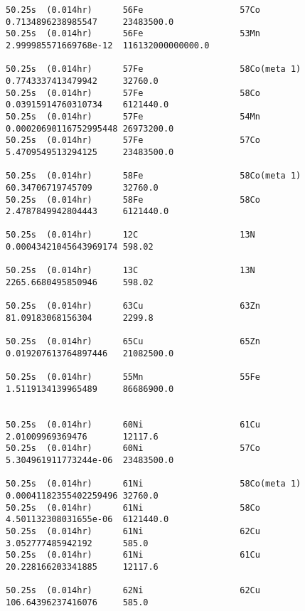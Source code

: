 \begin{lstlisting}[style=sOutputFile,caption={Final results for steel irradiation},label={listing:alexsteel}]
50.25s  (0.014hr)      56Fe                   57Co                   0.7134896238985547     23483500.0            
50.25s  (0.014hr)      56Fe                   53Mn                   2.999985571669768e-12  116132000000000.0     

50.25s  (0.014hr)      57Fe                   58Co(meta 1)           0.7743337413479942     32760.0               
50.25s  (0.014hr)      57Fe                   58Co                   0.03915914760310734    6121440.0             
50.25s  (0.014hr)      57Fe                   54Mn                   0.00020690116752995448 26973200.0            
50.25s  (0.014hr)      57Fe                   57Co                   5.4709549513294125     23483500.0            

50.25s  (0.014hr)      58Fe                   58Co(meta 1)           60.34706719745709      32760.0               
50.25s  (0.014hr)      58Fe                   58Co                   2.4787849942804443     6121440.0             

50.25s  (0.014hr)      12C                    13N                    0.00043421045643969174 598.02                

50.25s  (0.014hr)      13C                    13N                    2265.6680495850946     598.02                

50.25s  (0.014hr)      63Cu                   63Zn                   81.09183068156304      2299.8                

50.25s  (0.014hr)      65Cu                   65Zn                   0.019207613764897446   21082500.0            

50.25s  (0.014hr)      55Mn                   55Fe                   1.5119134139965489     86686900.0            


50.25s  (0.014hr)      60Ni                   61Cu                   2.01009969369476       12117.6               
50.25s  (0.014hr)      60Ni                   57Co                   5.304961911773244e-06  23483500.0            

50.25s  (0.014hr)      61Ni                   58Co(meta 1)           0.00041182355402259496 32760.0               
50.25s  (0.014hr)      61Ni                   58Co                   4.501132308031655e-06  6121440.0             
50.25s  (0.014hr)      61Ni                   62Cu                   3.052777485942192      585.0                 
50.25s  (0.014hr)      61Ni                   61Cu                   20.228166203341885     12117.6               

50.25s  (0.014hr)      62Ni                   62Cu                   106.64396237416076     585.0                 


\end{lstlisting}

